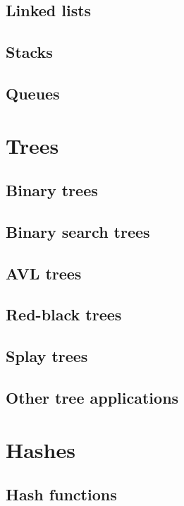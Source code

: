\documentclass[11pt,twoside]{book}
\begin{document}
\section{Linked lists}

\section{Stacks}

\section{Queues}


\chapter{Trees}

\section{Binary trees}

\section{Binary search trees}

\section{AVL trees}

\section{Red-black trees}

\section{Splay trees}

\section{Other tree applications}



\chapter{Hashes}

\section{Hash functions}
\end{document}
